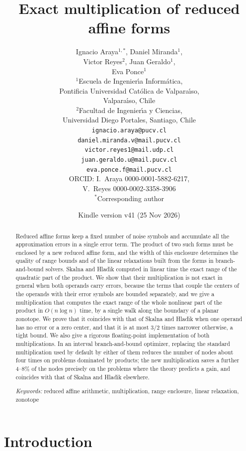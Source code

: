 \documentclass[10pt]{article}
\title{Exact multiplication of reduced affine forms}
\author{Ignacio Araya$^{1,*}$, Daniel Miranda$^{1}$,\\ Victor Reyes$^{2}$, Juan Geraldo$^{1}$,\\ Eva Ponce$^{1}$\\[2mm]
\small $^{1}$Escuela de Ingenier\'{\i}a Inform\'atica, \\ \small Pontificia Universidad Cat\'olica de Valpara\'{\i}so,\\ \small Valpara\'{\i}so, Chile\\
\small $^{2}$Facultad de Ingenier\'{\i}a y Ciencias,\\ \small Universidad Diego Portales, Santiago, Chile\\[1mm]
\small \texttt{ignacio.araya@pucv.cl}\\ \small \texttt{daniel.miranda.v@mail.pucv.cl}\\ \small \texttt{victor.reyes1@mail.udp.cl}\\ \small \texttt{juan.geraldo.u@mail.pucv.cl}\\ \small \texttt{eva.ponce.f@mail.pucv.cl}\\[1mm]
\small ORCID: I.~Araya 0000-0001-5882-6217,\\ \small V.~Reyes 0000-0002-3358-3906\\[1mm]
\small $^{*}$Corresponding author}
\date{\small Kindle version v41 (25 Nov 2026)}
\theoremstyle{definition}
\begin{document}
\maketitle

\begin{abstract}
Reduced affine forms keep a fixed number of noise symbols and accumulate all the approximation errors in a single error term. The product of two such forms must be enclosed by a new reduced affine form, and the width of this enclosure determines the quality of range bounds and of the linear relaxations built from the forms in branch-and-bound solvers. Skalna and Hlad\'{\i}k computed in linear time the exact range of the quadratic part of the product. We show that their multiplication is not exact in general when both operands carry errors, because the terms that couple the centers of the operands with their error symbols are bounded separately, and we give a multiplication that computes the exact range of the whole nonlinear part of the product in $O(n\log n)$ time, by a single walk along the boundary of a planar zonotope. We prove that it coincides with that of Skalna and Hlad\'{\i}k when one operand has no error or a zero center, and that it is at most $3/2$ times narrower otherwise, a tight bound. We also give a rigorous floating-point implementation of both multiplications. In an interval branch-and-bound optimizer, replacing the standard multiplication used by default by either of them reduces the number of nodes about four times on problems dominated by products; the new multiplication saves a further 4--8\% of the nodes precisely on the problems where the theory predicts a gain, and coincides with that of Skalna and Hlad\'{\i}k elsewhere.

\medskip\noindent
\textit{Keywords:} reduced affine arithmetic, multiplication, range enclosure, linear relaxation, zonotope
\end{abstract}

\section{Introduction}
\end{document}
